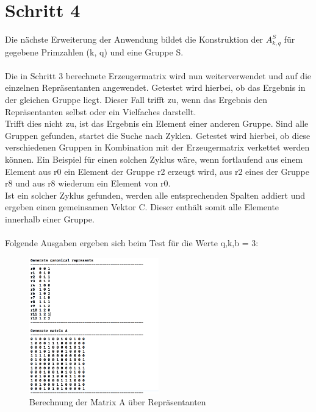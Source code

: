 \section{Schritt 4}
Die nächste Erweiterung der Anwendung bildet die Konstruktion der $A^{S}_{k,q}$ für gegebene Primzahlen (k, q) und eine Gruppe S.\\
\\
Die in Schritt 3 berechnete Erzeugermatrix wird nun weiterverwendet und auf die einzelnen Repräsentanten angewendet. Getestet wird hierbei, ob das Ergebnis in der gleichen Gruppe liegt. Dieser Fall trifft zu, wenn das Ergebnis den Repräsentanten selbst oder ein Vielfaches darstellt. \\
Trifft dies nicht zu, ist das Ergebnis ein Element einer anderen Gruppe. Sind alle Gruppen gefunden, startet die Suche nach Zyklen. Getestet wird hierbei, ob diese verschiedenen Gruppen in Kombination mit der Erzeugermatrix verkettet werden können. Ein Beispiel für einen solchen Zyklus wäre, wenn fortlaufend aus einem Element aus r0 ein Element der Gruppe r2 erzeugt wird, aus r2 eines der Gruppe r8 und aus r8 wiederum ein Element von r0.\\
Ist ein solcher Zyklus gefunden, werden alle entsprechenden Spalten addiert und ergeben einen gemeinsamen Vektor C. Dieser enthält somit alle Elemente innerhalb einer Gruppe.\\
\\
Folgende Ausgaben ergeben sich beim Test für die Werte q,k,b = 3:

\begin{figure}
	\centering
	\includegraphics[width=0.5\textwidth]{Pictures/step4_generateMatrix}
	\caption{Berechnung der Matrix A über Repräsentanten}
\end{figure}

